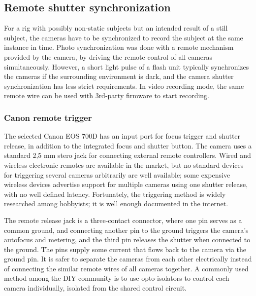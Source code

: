 
\subsection{Remote shutter synchronization} %

For a rig with possibly non-static subjects but an intended result of a still subject, the cameras have to be synchronized to record the subject at the same instance in time.
Photo synchronization was done with a remote mechanism provided by the camera, by driving the remote control of all cameras simultaneously.
However, a short light pulse of a flash unit typically synchronizes the cameras if the surrounding environment is dark, and the camera shutter synchronization has less strict requirements.
In video recording mode, the same remote wire can be used with 3rd-party firmware to start recording.


\subsubsection{Canon remote trigger} %

The selected Canon EOS 700D has an input port for focus trigger and shutter release, in addition to the integrated focus and shutter button.
The camera uses a standard 2,5 mm stero jack for connecting external remote controllers.
Wired and wireless electronic remotes are available in the market, but no standard devices for triggering several cameras arbitrarily are well available; some expensive wireless devices advertise support for multiple cameras using one shutter release, with no well defined latency.
Fortunately, the triggering method is widely researched among hobbyists; it is well enough documented in the internet.

The remote release jack is a three-contact connector, where one pin serves as a common ground, and connecting another pin to the ground triggers the camera's autofocus and metering, and the third pin releases the shutter when connected to the ground. \cite{docdiy}
The pins supply some current that flows back to the camera via the ground pin.
It is safer to separate the cameras from each other electrically instead of connecting the similar remote wires of all cameras together.
A commonly used method among the DIY community is to use opto-isolators to control each camera individually, isolated from the shared control circuit.

